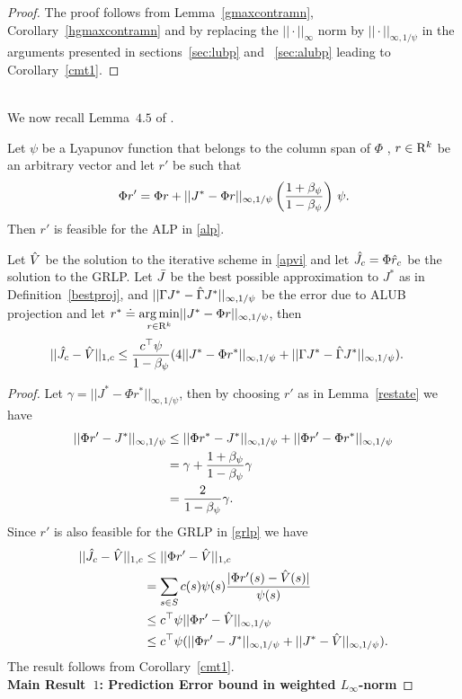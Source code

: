 \begin{proof}
The proof follows from Lemma~\ref{gmaxcontramn}, Corollary~\ref{hgmaxcontramn} and by replacing the $||\cdot||_\infty$ norm by $||\cdot||_{\infty,1/\psi}$ in the arguments presented in sections~\ref{sec:lubp} and ~\ref{sec:alubp} leading to Corollary~\ref{cmt1}.
\end{proof}\\
We now recall Lemma~$4.5$ of \cite{ALP}. 
\begin{lemma}\label{restate}
Let $\psi$ be a Lyapunov function that belongs to the column span of $\Phi$ , $r \in \mathrm{R}^k$ be an arbitrary vector and let $r'$ be such that
\begin{align}
\Phi r'=\Phi r+||J^*-\Phi r||_{\infty,1/\psi} \left(\frac{1+\beta_{\psi}}{1-\beta_{\psi}}\right)\, \psi.
\end{align}
Then $r'$ is feasible for the ALP in \eqref{alp}. 
\end{lemma}
\begin{theorem}\label{mt2mn}
Let $\hat{V}$ be the solution to the iterative scheme in \eqref{apvi} and let $\hat{J}_c=\Phi \hat{r}_c$ be the solution to the GRLP. Let $\bar{J}$ be the best possible approximation to $J^*$ as in Definition~\ref{bestproj}, and $||\Gamma J^* -\hat{\Gamma} J^*||_{\infty,1/\psi}$ be the error due to ALUB projection and let $r^*\doteq\underset{r\in \mathrm{R}^k}{\arg\min}||J^*-\Phi r||_{\infty,1/\psi}$, then
\begin{align}
||\hat{J}_c-\hat{V}||_{1,c}&\leq \frac{c^\top \psi}{1-\beta_\psi}(4||J^*-\Phi r^*||_{\infty,1/\psi}
+||\Gamma J^*-\hat{\Gamma} J^*||_{\infty,1/\psi}).
\end{align}
\end{theorem}
\begin{proof}
Let $\gamma=||J^*-\Phi r^*||_{\infty,1/\psi}$, then by choosing $r'$ as in Lemma~\ref{restate} we have
\begin{align}
||\Phi r'-J^*||_{\infty,1/\psi}&\leq ||\Phi r^*-J^*||_{\infty,1/\psi}+||\Phi r'-\Phi r^*||_{\infty,1/\psi}\nonumber\\
&=\gamma+\frac{1+\beta_\psi}{1-\beta_\psi}\gamma\nonumber\\
&=\frac{2}{1-\beta_\psi}\gamma.\nonumber
\end{align}
Since $r'$ is also feasible for the GRLP in \eqref{grlp} we have
\begin{align}
||\hat{J}_c-\hat{V}||_{1,c}&\leq||\Phi r'-\hat{V}||_{1,c}\nonumber\\
&=\sum_{s\in S}c(s)\psi(s)\frac{|\Phi r'(s)-\hat{V}(s)|}{\psi(s)}\nonumber\\
&\leq c^\top \psi ||\Phi r'-\hat{V}||_{\infty,1/\psi}\nonumber\\
&\leq c^\top \psi (||\Phi r'-J^*||_{\infty,1/\psi}+||J^*-\hat{V}||_{\infty,1/\psi}).
\end{align}
The result follows from Corollary~\ref{cmt1}.\\
\textbf{Main Result~$1$: Prediction Error bound in weighted $L_\infty$-norm}
\end{proof}

